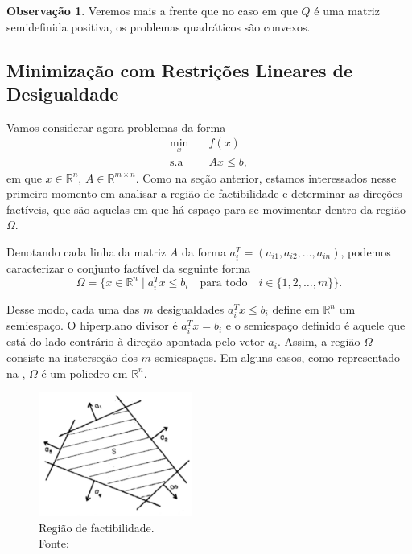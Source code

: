\documentclass[12pt,a4paper]{scrartcl}
\def\RR{\mathds{R}}
\theoremstyle{definition}%
\newtheorem{obs}{Observação}
\begin{document}
\begin{obs}
Veremos mais a frente que no caso em que $Q$ é uma matriz semidefinida positiva, os problemas quadráticos são convexos.
\end{obs}


\subsection{Minimização com Restrições Lineares de Desigualdade} \label{section:restricoes_desigualdade}

Vamos considerar agora problemas da forma
\[ \label{problema_geral_minimizacao_desigualdade}
\begin{aligned}
\min_{x} & \quad f(x) \\
\text{s.a} & \quad Ax \leq b,
\end{aligned}
\]
em que $x \in \RR^{n}$, $A \in \RR^{m\times n}$. Como na seção anterior, estamos interessados nesse primeiro momento em analisar a região de factibilidade e determinar as direções factíveis, que são aquelas em que há espaço para se movimentar dentro da região $\Omega$. 

Denotando cada linha da matriz $A$ da forma $a_{i}^{T} = (a_{i1} , a_{i2} , \ldots , a_{in})$, podemos caracterizar o conjunto factível da seguinte forma
\[
\Omega = \{ x\in \RR^{n} \mid a_{i}^{T}x \leq b_{i} \quad \text{para todo} \quad i \in \{ 1,2, \ldots , m \} \} .
\]

Desse modo, cada uma das $m$ desigualdades $a_{i}^{T}x \leq b_{i}$ define em $\RR^{n}$ um semiespaço. O hiperplano divisor é $a_{i}^{T}x = b_{i}$ e o semiespaço definido é aquele que está do lado contrário à direção apontada pelo vetor $a_{i}$. Assim, a região $\Omega$ consiste na insterseção dos $m$ semiespaços. Em alguns casos, como representado na , $\Omega$ é um poliedro em $\RR^{n}$.


\begin{figure}[!h] 
	\centering
	\includegraphics[width=0.45\textwidth]{regiao_factivel_poliedro}
	\caption{Região de factibilidade. \\ Fonte: \textcite{Ana1994} \label{fig:regiao_factivel_poliedro}}
\end{figure}
\end{document}
